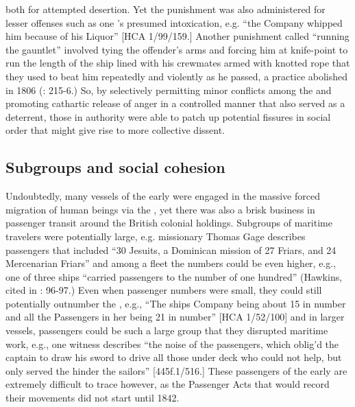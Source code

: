 both for attempted desertion.  Yet the punishment was also administered for lesser offenses such as one ’s presumed intoxication, e.g. “the Company whipped him because of his Liquor” [HCA 1/99/159.] Another punishment called “running the gauntlet” involved tying the offender’s arms and forcing him at knife-point to run the length of the ship lined with his crewmates armed with knotted rope that they used to beat him repeatedly and violently as he passed, a practice abolished in 1806 (\citealt{AdkinsAdkins2008}: 215-6.) So, by selectively permitting minor conflicts among the  and promoting cathartic release of anger in a controlled manner that also served as a deterrent, those in authority were able to patch up potential fissures in social order that might give rise to more collective dissent. 

\subsection{{Subgroups and social cohesion}}%

Undoubtedly, many  vessels of the early  were engaged in the massive forced migration of human beings via the , yet there was also a brisk business in passenger transit around the British colonial holdings. Subgroups of maritime travelers were potentially large, e.g. missionary Thomas Gage describes passengers that included “30 Jesuits, a Dominican mission of 27 Friars, and 24 Mercenarian Friars” \citep[15,]{Gage1648} and among a fleet the numbers could be even higher, e.g., one  of three ships “carried passengers to the number of one hundred” (Hawkins, cited in \citealt{Bicheno2012}: 96-97.) Even when passenger numbers were small, they could still potentially outnumber the , e.g., “The ships Company being about 15 in number and all the Passengers in her being 21 in number” [HCA 1/52/100] and in larger vessels, passengers could be such a large group that they disrupted maritime work, e.g., one witness describes “the noise of the passengers, which oblig’d the captain to draw his sword to drive all those under deck who could not help, but only served the hinder the sailors” [445f.1/516.] These passengers of the early  are extremely difficult to trace however, as the Passenger Acts that would record their movements did not start until 1842.

